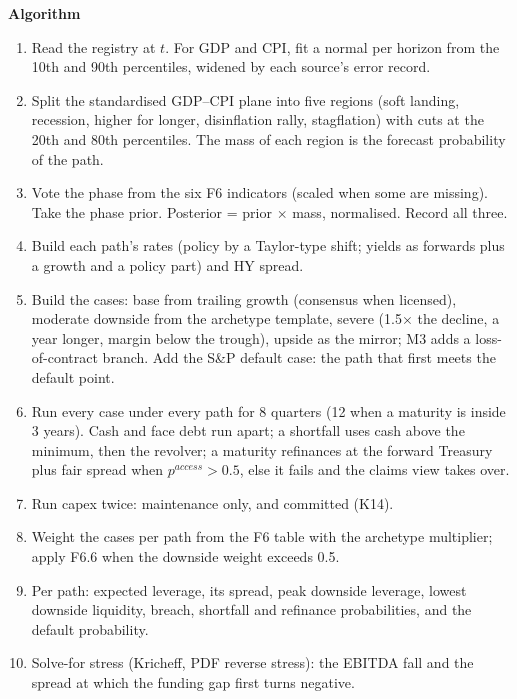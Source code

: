 \documentclass[11pt]{article}
\newcommand{\fld}[1]{\par\medskip\noindent\textbf{\textcolor{steel}{#1}}\par\nopagebreak}
\begin{document}
\fld{Algorithm}
\begin{algobox}
\begin{enumerate}
\item Read the registry at $t$. For GDP and CPI, fit a normal per horizon from the 10th and 90th percentiles, widened by each source's error record.
\item Split the standardised GDP--CPI plane into five regions (soft landing, recession, higher for longer, disinflation rally, stagflation) with cuts at the 20th and 80th percentiles. The mass of each region is the forecast probability of the path.
\item Vote the phase from the six F6 indicators (scaled when some are missing). Take the phase prior. Posterior = prior $\times$ mass, normalised. Record all three.
\item Build each path's rates (policy by a Taylor-type shift; yields as forwards plus a growth and a policy part) and HY spread.
\item Build the cases: base from trailing growth (consensus when licensed), moderate downside from the archetype template, severe (1.5$\times$ the decline, a year longer, margin below the trough), upside as the mirror; M3 adds a loss-of-contract branch. Add the S\&P default case: the path that first meets the default point.
\item Run every case under every path for 8 quarters (12 when a maturity is inside 3 years). Cash and face debt run apart; a shortfall uses cash above the minimum, then the revolver; a maturity refinances at the forward Treasury plus fair spread when $p^{access} > 0.5$, else it fails and the claims view takes over.
\item Run capex twice: maintenance only, and committed (K14).
\item Weight the cases per path from the F6 table with the archetype multiplier; apply F6.6 when the downside weight exceeds 0.5.
\item Per path: expected leverage, its spread, peak downside leverage, lowest downside liquidity, breach, shortfall and refinance probabilities, and the default probability.
\item Solve-for stress (Kricheff, PDF reverse stress): the EBITDA fall and the spread at which the funding gap first turns negative.
\end{enumerate}
\end{algobox}
\end{document}
